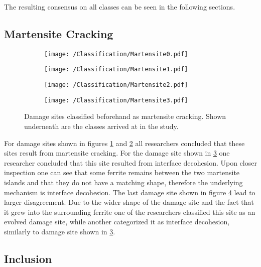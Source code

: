 The resulting consensus on all classes can be seen in the following sections. 

\subsection{Martensite Cracking}

\begin{figure}[H]
\begin{subfigure}{.25\textwidth}
\centering
  \texttt{[image: /Classification/Martensite0.pdf]}
  \caption{}
  \label{fig:MC1}
\end{subfigure}%
\begin{subfigure}{.25\textwidth}
\centering
  \texttt{[image: /Classification/Martensite1.pdf]}
  \caption{}
  \label{fig:MC2}
\end{subfigure}%
\centering
\begin{subfigure}{.25\textwidth}
\centering
  \texttt{[image: /Classification/Martensite2.pdf]}
  \caption{}
  \label{fig:MC3}
\end{subfigure}%
\begin{subfigure}{.25\textwidth}
\centering
  \texttt{[image: /Classification/Martensite3.pdf]}
  \caption{}
  \label{fig:MC4}
\end{subfigure}%
\caption{Damage sites classified beforehand as martensite cracking. Shown underneath are the classes arrived at in the study.}
\label{fig:MCStudy}
\end{figure}

For damage sites shown in figures \ref{fig:MC1} and \ref{fig:MC2} all researchers concluded that these sites result from martensite cracking. For the damage site shown in \ref{fig:MC3} one researcher concluded that this site resulted from interface decohesion. Upon closer inspection one can see that some ferrite remains between the two martensite islands and that they do not have a matching shape, therefore the underlying mechanism is interface decohesion. The last damage site shown in figure \ref{fig:MC4} lead to larger disagreement. Due to the wider shape of the damage site and the fact that it grew into the surrounding ferrite one of the researchers classified this site as an evolved damage site, while another categorized it as interface decohesion, similarly to damage site shown in \ref{fig:MC3}. 

\subsection{Inclusion}

